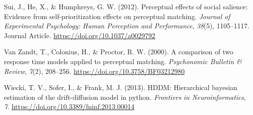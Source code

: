 \documentclass[
  english,
  man]{apa6}
\begin{document}
\leavevmode\hypertarget{ref-Sui_2012_JEPHPP}{}%
Sui, J., He, X., \& Humphreys, G. W. (2012). Perceptual effects of social salience: Evidence from self-prioritization effects on perceptual matching. \emph{Journal of Experimental Psychology: Human Perception and Performance}, \emph{38}(5), 1105--1117. Journal Article. \url{https://doi.org/10.1037/a0029792}

\leavevmode\hypertarget{ref-van_zandt_comparison_2000}{}%
Van Zandt, T., Colonius, H., \& Proctor, R. W. (2000). A comparison of two response time models applied to perceptual matching. \emph{Psychonomic Bulletin \& Review}, \emph{7}(2), 208--256. \url{https://doi.org/10.3758/BF03212980}

\leavevmode\hypertarget{ref-wiecki_hddm_2013}{}%
Wiecki, T. V., Sofer, I., \& Frank, M. J. (2013). HDDM: Hierarchical bayesian estimation of the drift-diffusion model in python. \emph{Frontiers in Neuroinformatics}, \emph{7}. \url{https://doi.org/10.3389/fninf.2013.00014}

\endgroup
\end{document}
